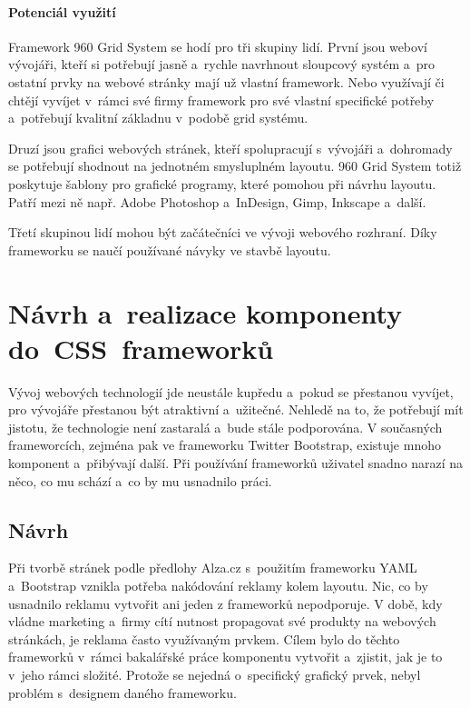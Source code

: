 \documentclass[thesis=B,czech]{FITthesis}[2012/06/26]
\begin{document}
\paragraph{Potenciál využití}

Framework 960 Grid System se hodí pro tři skupiny lidí. První jsou weboví vývojáři, kteří si potřebují jasně a~rychle navrhnout sloupcový systém a~pro ostatní prvky na webové stránky mají už vlastní framework. Nebo využívají či chtějí vyvíjet v~rámci své firmy framework pro své vlastní specifické potřeby a~potřebují kvalitní základnu v~podobě grid systému. 

Druzí jsou grafici webových stránek, kteří spolupracují s~vývojáři a~dohromady se potřebují shodnout na jednotném smysluplném layoutu. 960 Grid System totiž poskytuje šablony pro grafické programy, které pomohou při návrhu layoutu. Patří mezi ně např. Adobe Photoshop a~InDesign, Gimp, Inkscape a~další. 

Třetí skupinou lidí mohou být začátečníci ve vývoji webového rozhraní. Díky frameworku se naučí používané návyky ve stavbě layoutu.



\section{Návrh a~realizace komponenty do~CSS~frameworků}


Vývoj webových technologií jde neustále kupředu a~pokud se přestanou vyvíjet, pro vývojáře přestanou být atraktivní a~užitečné. Nehledě na to, že potřebují mít jistotu, že technologie není zastaralá a~bude stále podporována. V současných frameworcích, zejména pak ve frameworku Twitter Bootstrap, existuje mnoho komponent a~přibývají další. Při používání frameworků uživatel snadno narazí na něco, co mu schází a~co by mu usnadnilo práci.

\subsection{Návrh}

Při tvorbě stránek podle předlohy Alza.cz s~použitím frameworku YAML a~Bootstrap vznikla potřeba nakódování reklamy kolem layoutu. Nic, co by usnadnilo reklamu vytvořit ani jeden z frameworků nepodporuje. V době, kdy vládne marketing a~firmy cítí nutnost propagovat své produkty na webových stránkách, je reklama často využívaným prvkem. Cílem bylo do těchto frameworků v~rámci bakalářské práce komponentu vytvořit a~zjistit, jak je to v~jeho rámci složité. Protože se nejedná o~specifický grafický prvek, nebyl problém s~designem daného frameworku.
\end{document}
